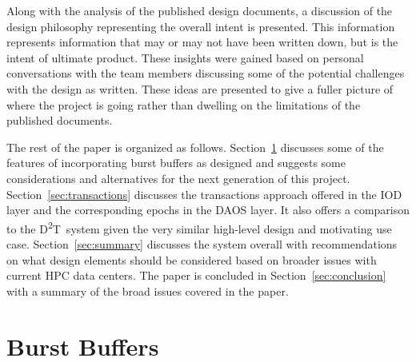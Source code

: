 \documentclass[conference]{IEEEtran}
\newcommand{\DDT}{D\textsuperscript{2}T~}
\begin{document}
Along with the analysis of the published design documents, a discussion of the
design philosophy representing the overall intent is presented. This
information represents information that may or may not have been written down,
but is the intent of ultimate product. These insights were gained based on
personal conversations with the team members discussing some of the potential
challenges with the design as written. These ideas are presented to give a
fuller picture of where the project is going rather than dwelling on the
limitations of the published documents.

The rest of the paper is organized as follows. Section~\ref{sec:burst}
discusses some of the features of incorporating burst buffers as designed and
suggests some considerations and alternatives for the next generation of this
project. Section~\ref{sec:transactions} discusses the transactions approach
offered in the IOD layer and the corresponding epochs in the DAOS layer. It
also offers a comparison to the \DDT system given the very similar high-level
design and motivating use case.  Section~\ref{sec:summary} discusses the system
overall with recommendations on what design elements should be considered based
on broader issues with current HPC data centers. The paper is concluded in
Section~\ref{sec:conclusion} with a summary of the broad issues covered in the
paper.

\section{Burst Buffers}
\label{sec:burst}
\end{document}
